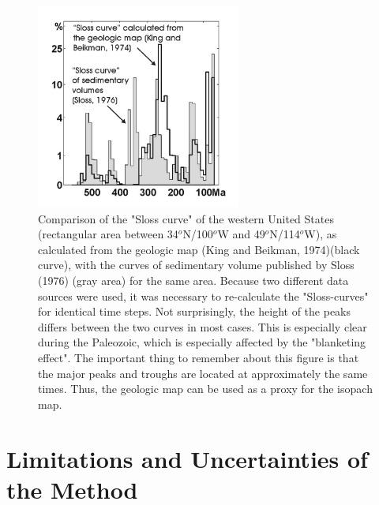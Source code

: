 \documentclass{article}
\begin{document}
 \begin{figure}[here]
 \begin{center}
 \includegraphics[width=0.6\textwidth]{problems2c.jpg}
 \caption{
 Comparison  of  the  "Sloss  curve"  of  the  western  United  States
 (rectangular area between  34$^o$N/100$^o$W and 49$^o$N/114$^o$W), as
 calculated  from  the geologic  map  (King  and Beikman,  1974)(black
 curve),  with the  curves of  sedimentary volume  published  by Sloss
 (1976) (gray  area) for  the same  area. Because  two  different data
 sources   were   used,  it   was   necessary   to  re-calculate   the
 "Sloss-curves"  for  identical  time  steps.  Not  surprisingly,  the
 height of  the peaks  differs between the  two curves in  most cases.
 This is  especially clear during  the Paleozoic, which  is especially
 affected by the "blanketing  effect". The important thing to remember
 about this figure is that the  major peaks and troughs are located at
 approximately the same times. Thus, the geologic map can be used as a
 proxy for the isopach map.}
 \label{fig:problems2}
 \end{center}
 \end{figure}

 \section*{Limitations and Uncertainties of the Method} 
 \label{sec:limitations}
\end{document}
